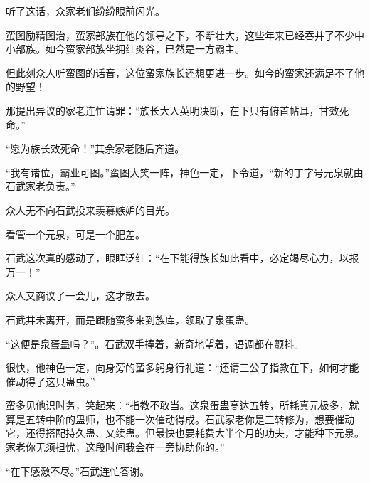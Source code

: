 \begin{this_body}
听了这话，众家老们纷纷眼前闪光。

蛮图励精图治，蛮家部族在他的领导之下，不断壮大，这些年来已经吞并了不少中小部族。如今蛮家部族坐拥红炎谷，已然是一方霸主。

但此刻众人听蛮图的话音，这位蛮家族长还想更进一步。如今的蛮家还满足不了他的野望！

那提出异议的家老连忙请罪：“族长大人英明决断，在下只有俯首帖耳，甘效死命。”

“愿为族长效死命！”其余家老随后齐道。

“我有诸位，霸业可图。”蛮图大笑一阵，神色一定，下令道，“新的丁字号元泉就由石武家老负责。”

众人无不向石武投来羡慕嫉妒的目光。

看管一个元泉，可是一个肥差。

石武这次真的感动了，眼眶泛红：“在下能得族长如此看中，必定竭尽心力，以报万一！”

众人又商议了一会儿，这才散去。

石武并未离开，而是跟随蛮多来到族库，领取了泉蛋蛊。

“这便是泉蛋蛊吗？”。石武双手捧着，新奇地望着，语调都在颤抖。

很快，他神色一定，向身旁的蛮多躬身行礼道：“还请三公子指教在下，如何才能催动得了这只蛊虫。”

蛮多见他识时务，笑起来：“指教不敢当。这泉蛋蛊高达五转，所耗真元极多，就算是五转中阶的蛊师，也不能一次催动得成。石武家老你是三转修为，想要催动它，还得搭配持久蛊、又续蛊。但最快也要耗费大半个月的功夫，才能种下元泉。家老你无须担忧，这段时间我会在一旁协助你的。”

“在下感激不尽。”石武连忙答谢。

\end{this_body}

